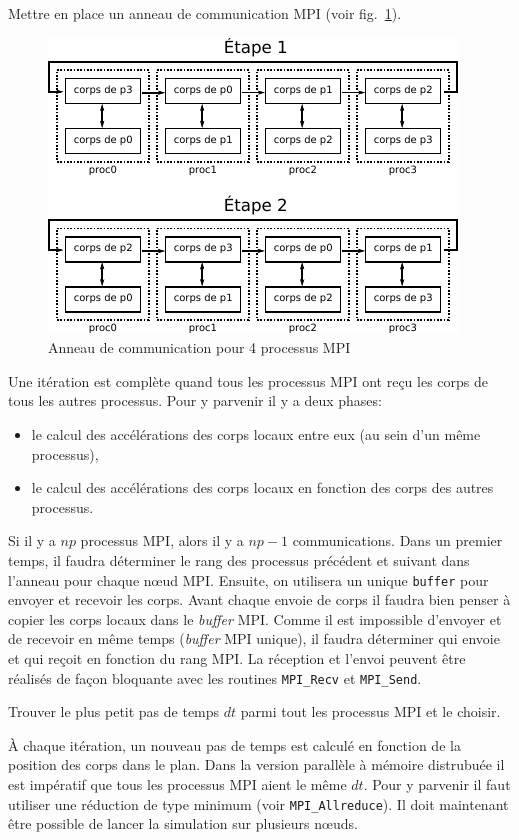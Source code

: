 \begin{questions}
	\question Mettre en place un anneau de communication MPI (voir fig.~\ref{fig:anneau}).
	\begin{figure}[htbp]
		\centering
		\includegraphics[width=0.6\linewidth]{schemas/anneau_sans_buffering.pdf}
		\caption{Anneau de communication pour 4 processus MPI}
		\label{fig:anneau}
	\end{figure}
	\begin{solution}
		Une itération est complète quand tous les processus MPI ont reçu les corps de tous les autres processus.
		Pour y parvenir il y a deux phases:
		\begin{itemize}
			\item le calcul des accélérations des corps locaux entre eux (au sein d'un même processus),
			\item le calcul des accélérations des corps locaux en fonction des corps des autres processus.
		\end{itemize}
		Si il y a $np$ processus MPI, alors il y a $np-1$ communications.
		Dans un premier temps, il faudra déterminer le rang des processus précédent et suivant dans l'anneau pour chaque n\oe ud MPI.
		Ensuite, on utilisera un unique \texttt{buffer} pour envoyer et recevoir les corps.
		Avant chaque envoie de corps il faudra bien penser à copier les corps locaux dans le \textit{buffer} MPI.
		Comme il est impossible d'envoyer et de recevoir en même temps (\textit{buffer} MPI unique), il faudra déterminer qui envoie et qui reçoit en fonction du rang MPI.
		La réception et l'envoi peuvent être réalisés de façon bloquante avec les routines \texttt{MPI\_Recv} et \texttt{MPI\_Send}.
	\end{solution}

	\question Trouver le plus petit pas de temps $dt$ parmi tout les processus MPI et le choisir.
	\begin{solution}
		À chaque itération, un nouveau pas de temps est calculé en fonction de la position des corps dans le plan.
		Dans la version parallèle à mémoire distrubuée il est impératif que tous les processus MPI aient le même $dt$.
		Pour y parvenir il faut utiliser une réduction de type minimum (voir \texttt{MPI\_Allreduce}).
		Il doit maintenant être possible de lancer la simulation sur plusieurs n\oe uds.
	\end{solution}
\end{questions}

